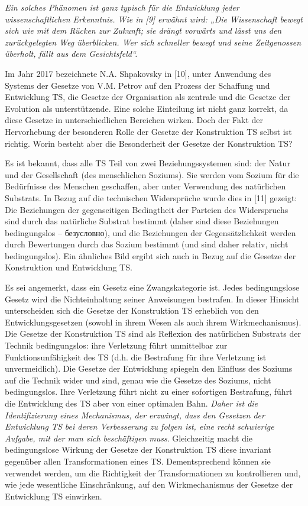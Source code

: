 \documentclass[11pt,a4paper]{article}
\begin{document}
\emph{Ein solches Phänomen ist ganz typisch für die Entwicklung jeder
  wissenschaftlichen Erkenntnis. Wie in [9] erwähnt wird: „Die Wissenschaft
  bewegt sich wie mit dem Rücken zur Zukunft; sie drängt vorwärts und lässt
  uns den zurückgelegten Weg überblicken. Wer sich schneller bewegt und seine
  Zeitgenossen überholt, fällt aus dem Gesichtsfeld“.}

Im Jahr 2017 bezeichnete N.A. Shpakovsky in [10], unter Anwendung des Systems
der Gesetze von V.M. Petrov auf den Prozess der Schaffung und Entwicklung TS,
die Gesetze der Organisation als zentrale und die Gesetze der Evolution als
unterstützende. Eine solche Einteilung ist nicht ganz korrekt, da diese
Gesetze in unterschiedlichen Bereichen wirken. Doch der Fakt der Hervorhebung
der besonderen Rolle der Gesetze der Konstruktion TS selbst ist richtig. Worin
besteht aber die Besonderheit der Gesetze der Konstruktion TS?

Es ist bekannt, dass alle TS Teil von zwei Beziehungssystemen sind: der Natur
und der Gesellschaft (des menschlichen Soziums).  Sie werden vom Sozium für
die Bedürfnisse des Menschen geschaffen, aber unter Verwendung des natürlichen
Substrats.  In Bezug auf die technischen Widersprüche wurde dies in [11]
gezeigt: Die Beziehungen der gegenseitigen Bedingtheit der Parteien des
Widerspruchs sind durch das natürliche Substrat bestimmt (daher sind diese
Beziehungen bedingungslos -- \foreignlanguage{russian}{безусловно}), und die
Beziehungen der Gegensätzlichkeit werden durch Bewertungen durch das Sozium
bestimmt (und sind daher relativ, nicht bedingungslos). Ein ähnliches Bild
ergibt sich auch in Bezug auf die Gesetze der Konstruktion und Entwicklung TS.

Es sei angemerkt, dass ein Gesetz eine Zwangskategorie ist. Jedes
bedingungslose Gesetz wird die Nichteinhaltung seiner Anweisungen bestrafen.
In dieser Hinsicht unterscheiden sich die Gesetze der Konstruktion TS
erheblich von den Entwicklungsgesetzen (sowohl in ihrem Wesen als auch ihrem
Wirkmechanismus). Die Gesetze der Konstruktion TS sind als Reflexion des
natürlichen Substrats der Technik bedingungslos: ihre Verletzung führt
unmittelbar zur Funktionsunfähigkeit des TS (d.h. die Bestrafung für ihre
Verletzung ist unvermeidlich). Die Gesetze der Entwicklung spiegeln den
Einfluss des Soziums auf die Technik wider und sind, genau wie die Gesetze des
Soziums, nicht bedingungslos. Ihre Verletzung führt nicht zu einer sofortigen
Bestrafung, führt die Entwicklung des TS aber von einer optimalen Bahn.
\emph{Daher ist die Identifizierung eines Mechanismus, der erzwingt, dass den
  Gesetzen der Entwicklung TS bei deren Verbesserung zu folgen ist, eine recht
  schwierige Aufgabe, mit der man sich beschäftigen muss}. Gleichzeitig macht
die bedingungslose Wirkung der Gesetze der Konstruktion TS diese invariant
gegenüber allen Transformationen eines TS.  Dementsprechend können sie
verwendet werden, um die Richtigkeit der Transformationen zu kontrollieren
und, wie jede wesentliche Einschränkung, auf den Wirkmechanismus der Gesetze
der Entwicklung TS einwirken.
\end{document}

